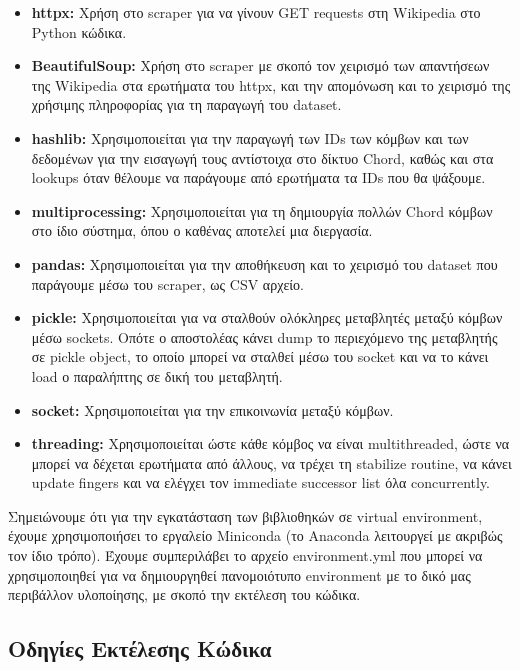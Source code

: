 \documentclass[12pt,a4paper]{article}
\begin{document}
\begin{itemize}
	\item \textbf{httpx:} Χρήση στο scraper για να γίνουν GET requests στη Wikipedia στο Python κώδικα.
	\item \textbf{BeautifulSoup:} Χρήση στο scraper με σκοπό τον χειρισμό των απαντήσεων της Wikipedia στα ερωτήματα του httpx, και την απομόνωση και το χειρισμό της χρήσιμης πληροφορίας για τη παραγωγή του dataset.
	\item \textbf{hashlib:} Χρησιμοποιείται για την παραγωγή των IDs των κόμβων και των δεδομένων για την εισαγωγή τους αντίστοιχα στο δίκτυο Chord, καθώς και στα lookups όταν θέλουμε να παράγουμε από ερωτήματα τα IDs που θα ψάξουμε.
	\item \textbf{multiprocessing:} Χρησιμοποιείται για τη δημιουργία πολλών Chord κόμβων στο ίδιο σύστημα, όπου ο καθένας αποτελεί μια διεργασία.
	\item \textbf{pandas:} Χρησιμοποιείται για την αποθήκευση και το χειρισμό του dataset που παράγουμε μέσω του scraper, ως CSV αρχείο.
	\item \textbf{pickle:} Χρησιμοποιείται για να σταλθούν ολόκληρες μεταβλητές μεταξύ κόμβων μέσω sockets. Οπότε ο αποστολέας κάνει dump το περιεχόμενο της μεταβλητής σε pickle object, το οποίο μπορεί να σταλθεί μέσω του socket και να το κάνει load ο παραλήπτης σε δική του μεταβλητή.
	\item \textbf{socket:} Χρησιμοποιείται για την επικοινωνία μεταξύ κόμβων.
	\item \textbf{threading:} Χρησιμοποιείται ώστε κάθε κόμβος να είναι multithreaded, ώστε να μπορεί να δέχεται ερωτήματα από άλλους, να τρέχει τη stabilize routine, να κάνει update fingers και να ελέγχει τον immediate successor list όλα concurrently.
\end{itemize}

Σημειώνουμε ότι για την εγκατάσταση των βιβλιοθηκών σε virtual environment, έχουμε χρησιμοποιήσει το εργαλείο Miniconda (το Anaconda λειτουργεί με ακριβώς τον ίδιο τρόπο). Έχουμε συμπεριλάβει το αρχείο environment.yml που μπορεί να χρησιμοποιηθεί για να δημιουργηθεί πανομοιότυπο environment με το δικό μας περιβάλλον υλοποίησης, με σκοπό την εκτέλεση του κώδικα.

\subsection{Οδηγίες Εκτέλεσης Κώδικα}
\end{document}
